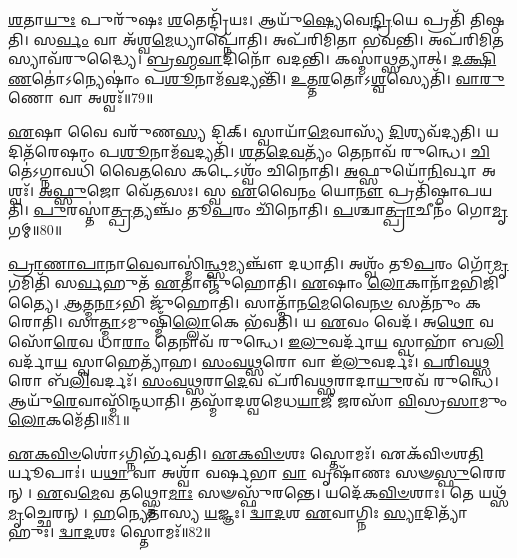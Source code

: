 \-\ul{𑌶}\-𑌤𑌾\-\ul{𑌯𑍁𑌃} 𑌪𑍁𑌰𑍁᳴𑌷𑌃 \ul{𑌶}\-𑌤𑍇𑌨𑍍𑌦𑍍𑌰𑌿᳴𑌯𑌃।
𑌆𑌯𑍁᳴\-\ul{𑌷𑍍𑌯𑍇}\-𑌵𑍇\-\ul{𑌨𑍍𑌦𑍍𑌰𑌿}\-𑌯𑍇 𑌪𑍍𑌰𑌤𑌿᳴ 𑌤𑌿𑌷𑍍𑌠𑌤𑌿।
𑌸\-\ul{𑌰𑍍𑌵𑌂} 𑌵𑌾 𑌅᳴𑌶𑍍𑌵\-\ul{𑌮𑍇}\-𑌧𑍍𑌯𑌾𑌪𑍍𑌨𑍋᳴𑌤𑌿।
𑌅𑌪᳴𑌰𑌿𑌮𑌿𑌤𑌾 𑌭𑌵𑌨𑍍𑌤𑌿।
𑌅𑌪᳴𑌰𑌿𑌮𑌿\-\ul{𑌤}\-𑌸𑍍𑌯𑌾𑌵᳴𑌰𑍁𑌦𑍍𑌧𑍍𑌯𑍈।
\-\ul{𑌬𑍍𑌰}\-\-\ul{𑌹𑍍𑌮}\-\-\ul{𑌵𑌾}\-𑌦𑌿𑌨𑍋᳴ 𑌵𑌦𑌨𑍍𑌤𑌿।
𑌕𑌸𑍍𑌮𑌾॑\-\ul{𑌥𑍍𑌸}\-𑌤𑍍𑌯𑌾𑌤𑍍।
\-\ul{𑌦}\-\-\ul{𑌕𑍍𑌷𑌿}\-\-\ul{𑌣}\-𑌤𑍋॑\-𑌽𑌨𑍍𑌯𑍇𑌷𑌾𑌂॑ 𑌪\-\ul{𑌶𑍂}\-𑌨𑌾𑌮᳴\-\ul{𑌵}\-𑌦𑍍𑌯𑌨𑍍𑌤𑌿᳴।
\-\ul{𑌉}\-\-\ul{𑌤𑍍𑌤}\-\-\ul{𑌰}\-𑌤𑍋\-𑌽\-\ul{𑌶𑍍𑌵}\-𑌸𑍍𑌯𑍇𑌤𑌿᳴।
\-\ul{𑌵𑌾}\-\-\ul{𑌰𑍁}\-𑌣𑍋 𑌵𑌾 𑌅𑌶𑍍𑌵𑌃᳴॥79॥

\-\ul{𑌏}\-𑌷𑌾 𑌵𑍈 𑌵𑌰𑍁᳴𑌣\-\ul{𑌸𑍍𑌯} 𑌦𑌿𑌕𑍍।
𑌸𑍍𑌵𑌾𑌯𑌾᳴\-\ul{𑌮𑍇}\-𑌵𑌾𑌸𑍍𑌯᳴ \ul{𑌦𑌿}\-𑌶𑍍𑌯𑌵᳴𑌦𑍍𑌯𑌤𑌿।
𑌯𑌦𑌿𑌤᳴𑌰𑍇𑌷𑌾𑌂 𑌪\-\ul{𑌶𑍂}\-𑌨𑌾𑌮᳴\-\ul{𑌵}\-𑌦𑍍𑌯𑌤𑌿᳴।
\-\ul{𑌶}\-\-\ul{𑌤}\-\-\ul{𑌦𑍇}\-\-\ul{𑌵}\-𑌤𑍍𑌯𑌂᳴ 𑌤𑍇𑌨𑌾𑌵᳴ 𑌰𑍁𑌨𑍍𑌧𑍇।
\-\ul{𑌚𑌿}\-𑌤𑍇॑\-𑌽𑌗𑍍𑌨𑌾𑌵𑌧𑌿᳴ 𑌵𑍈\-\ul{𑌤}\-𑌸𑍇 𑌕𑌟𑍇\-𑌽𑌶𑍍𑌵𑌂᳴ 𑌚𑌿𑌨𑍋𑌤𑌿।
\-\ul{𑌅}\-𑌫𑍍𑌸𑍁𑌯𑍋᳴\-\ul{𑌨𑌿}\-𑌰𑍍𑌵𑌾 𑌅𑌶𑍍𑌵𑌃᳴।
\-\ul{𑌅}\-\-\ul{𑌫𑍍𑌸𑍁}\-𑌜𑍋 𑌵𑍇᳴\-\ul{𑌤}\-𑌸𑌃।
𑌸𑍍𑌵 \ul{𑌏}\-𑌵𑍈\-\ul{𑌨𑌂} 𑌯𑍋\-\ul{𑌨𑍗} 𑌪𑍍𑌰𑌤𑌿᳴\-𑌷𑍍𑌠𑌾𑌪𑌯𑌤𑌿।
\-\ul{𑌪𑍁}\-𑌰𑌸𑍍𑌤𑌾॑\-\ul{𑌤𑍍𑌪𑍍𑌰}\-𑌤𑍍𑌯𑌞𑍍𑌚𑌂᳴ 𑌤𑍂\-\ul{𑌪}\-𑌰𑌂 𑌚𑌿᳴𑌨𑍋𑌤𑌿।
\-\ul{𑌪}\-𑌶𑍍𑌚𑌾\-\ul{𑌤𑍍𑌪𑍍𑌰𑌾}\-𑌚𑍀𑌨𑌂᳴ 𑌗𑍋\-\ul{𑌮𑍃}\-𑌗𑌮𑍍॥80॥

\-\ul{𑌪𑍍𑌰𑌾}\-\-\ul{𑌣𑌾}\-\-\ul{𑌪𑌾}\-𑌨𑌾\-\ul{𑌵𑍇}\-𑌵𑌾𑌸𑍍𑌮𑌿॑\-\ul{𑌨𑍍𑌥𑍍𑌸}\-𑌮𑍍𑌯𑌞𑍍𑌚𑍗᳴ 𑌦𑌧𑌾𑌤𑌿।
𑌅𑌶𑍍𑌵𑌂᳴ 𑌤𑍂\-\ul{𑌪}\-𑌰𑌂 𑌗𑍋᳴\-\ul{𑌮𑍃}\-𑌗𑌮𑌿𑌤𑌿᳴ 𑌸\-\ul{𑌰𑍍𑌵}\-𑌹𑍁𑌤᳴ \ul{𑌏}\-𑌤𑌾𑌞𑍍𑌜𑍁᳴𑌹𑍋𑌤𑌿।
\-\ul{𑌏}\-𑌷𑌾𑌂 \ul{𑌲𑍋}\-𑌕𑌾𑌨𑌾᳴\-\ul{𑌮}\-𑌭𑌿𑌜𑌿᳴𑌤𑍍𑌯𑍈।
\-\ul{𑌆}\-𑌤𑍍𑌮\-\ul{𑌨𑌾}\-𑌽𑌭𑌿 𑌜𑍁᳴𑌹𑍋𑌤𑌿।
𑌸𑌾𑌤𑍍𑌮𑌾᳴𑌨\-\ul{𑌮𑍇}\-𑌵𑍈\-\ul{𑌨}\-\-\ul{𑍞} 𑌸𑌤᳴𑌨𑍁𑌂 𑌕𑌰𑍋𑌤𑌿।
𑌸𑌾\-\ul{𑌤𑍍𑌮𑌾}\-\-𑌽𑌮𑍁𑌷𑍍𑌮𑌿𑌁᳴\-\ul{𑌲𑍍𑌲𑍋}\-𑌕𑍇 𑌭᳴𑌵𑌤𑌿।
𑌯 \ul{𑌏}\-𑌵𑌂 𑌵𑍇𑌦᳴।
𑌅\-\ul{𑌥𑍋} 𑌵𑌸𑍋᳴\-\ul{𑌰𑍇}\-𑌵 𑌧𑌾\-\ul{𑌰𑌾𑌂} 𑌤𑍇𑌨𑌾𑌵᳴ 𑌰𑍁𑌨𑍍𑌧𑍇।
\-\ul{𑌇}\-\-\ul{𑌲𑍁}\-𑌵𑌰𑍍𑌦𑌾᳴\-\ul{𑌯} 𑌸𑍍𑌵𑌾𑌹𑌾᳴ 𑌬\-\ul{𑌲𑌿}\-𑌵𑌰𑍍𑌦𑌾᳴\-\ul{𑌯} 𑌸𑍍𑌵𑌾𑌹𑍇𑌤𑍍𑌯𑌾᳴𑌹।
\-\ul{𑌸𑌂}\-\-\ul{𑌵}\-\-\ul{𑌥𑍍𑌸}\-𑌰𑍋 𑌵𑌾 𑌇᳴\-\ul{𑌲𑍁}\-𑌵𑌰𑍍𑌦𑌃᳴।
\-\ul{𑌪}\-\-\ul{𑌰𑌿}\-\-\ul{𑌵}\-\-\ul{𑌥𑍍𑌸}\-𑌰𑍋 𑌬᳴\-\ul{𑌲𑌿}\-𑌵𑌰𑍍𑌦𑌃᳴।
\-\ul{𑌸𑌂}\-\-\ul{𑌵}\-\-\ul{𑌥𑍍𑌸}\-𑌰𑌾\-\ul{𑌦𑍇}\-𑌵 𑌪᳴𑌰𑌿𑌵\-\ul{𑌥𑍍𑌸}\-𑌰𑌾𑌦𑌾\-\ul{𑌯𑍁}\-𑌰𑌵᳴ 𑌰𑍁𑌨𑍍𑌧𑍇।
𑌆𑌯𑍁᳴\-\ul{𑌰𑍇}\-𑌵𑌾𑌸𑍍𑌮𑌿᳴𑌨𑍍𑌦𑌧𑌾𑌤𑌿।
𑌤𑌸𑍍𑌮𑌾᳴𑌦𑌶𑍍𑌵𑌮𑍇𑌧\-\ul{𑌯𑌾}\-𑌜𑍀 \ul{𑌜}\-𑌰𑌸𑌾᳴ \ul{𑌵𑌿}\-𑌸𑍍𑌰\-\ul{𑌸𑌾}\-𑌮𑍁𑌂 \ul{𑌲𑍋}\-𑌕𑌮𑍇᳴𑌤𑌿॥81॥\anuvakamend[𑌤𑍇\-\ul{𑌜}\-𑌸𑍋\-𑌽𑌵᳴𑌰𑍁𑌦𑍍𑌧𑍍𑌯𑍈 𑌭\-\ul{𑌵}\-𑌨𑍍𑌤𑍍𑌯𑌶𑍍𑌵𑍋᳴ 𑌗𑍋\-\ul{𑌮𑍃}\-𑌗𑌮𑌿᳴\-\ul{𑌲𑍁}\-𑌵𑌰𑍍𑌦᳴\-\ul{𑌶𑍍𑌚}\-𑌤𑍍𑌵𑌾𑌰𑌿᳴ 𑌚]

\-\ul{𑌏}\-\-\ul{𑌕}\-\-\ul{𑌵𑌿}\-\-\ul{𑍞}\-𑌶𑍋॑\-𑌽𑌗𑍍𑌨𑌿𑌰𑍍𑌭᳴𑌵𑌤𑌿।
\-\ul{𑌏}\-\-\ul{𑌕}\-\-\ul{𑌵𑌿}\-\-\ul{𑍞}\-𑌶𑌃 𑌸𑍍𑌤𑍋𑌮𑌃᳴।
𑌏𑌕᳴\-𑌵𑌿𑍞𑌶\-\ul{𑌤𑌿}\-𑌰𑍍𑌯𑍂𑌪𑌾𑌃॑।
𑌯\-\ul{𑌥𑌾} 𑌵𑌾 𑌅𑌶𑍍𑌵𑌾᳴ 𑌵𑌰𑍍\mbox{}\-\ul{𑌷}\-𑌭𑌾 \ul{𑌵𑌾} 𑌵𑍃𑌷𑌾᳴𑌣𑌃 𑌸𑍟\-\ul{𑌸𑍍𑌫𑍁}\-𑌰𑍇𑌰𑌨𑍍।
\-\ul{𑌏}\-𑌵\-\ul{𑌮𑍇}\-𑌵 𑌤𑌥𑍍𑌸𑍍𑌤𑍋\-\ul{𑌮𑌾𑌃} 𑌸𑍟𑌸𑍍𑌫𑍁᳴𑌰𑌨𑍍𑌤𑍇।
𑌯𑌦𑍇᳴𑌕\-\ul{𑌵𑌿}\-\-\ul{𑍞}\-𑌶𑌾𑌃।
𑌤𑍇 𑌯𑌥𑍍𑌸᳴\-\ul{𑌮𑍃}\-𑌚𑍍𑌛𑍇𑌰𑌨𑍍।
\-\ul{𑌹}\-𑌨𑍍𑌯𑍇𑌤𑌾॑𑌸𑍍𑌯 \ul{𑌯}\-𑌜𑍍𑌞𑌃।
\-\ul{𑌦𑍍𑌵𑌾}\-\-\ul{𑌦}\-𑌶 \ul{𑌏}\-𑌵𑌾𑌗𑍍𑌨𑌿𑌃 \ul{𑌸𑍍𑌯𑌾}\-𑌦𑌿𑌤𑍍𑌯𑌾᳴𑌹𑍁𑌃।
\-\ul{𑌦𑍍𑌵𑌾}\-\-\ul{𑌦}\-𑌶𑌃 𑌸𑍍𑌤𑍋𑌮𑌃᳴॥82॥

